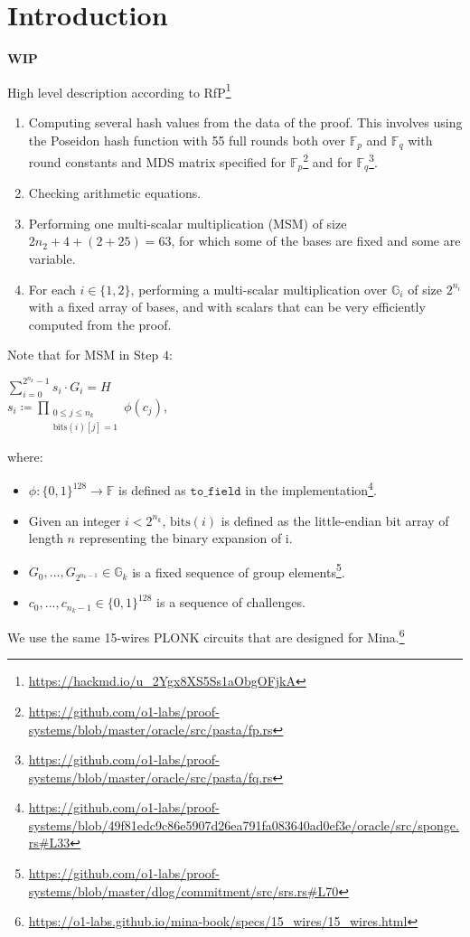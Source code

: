 \section{Introduction}
\label{section:circuit_introduction}
\textbf{WIP}

High level description according to RfP\footnote{\url{https://hackmd.io/u_2Ygx8XS5Ss1aObgOFjkA}}
\begin{enumerate}
    \item Computing several hash values from the data of the proof.
    This involves using the Poseidon hash function with 55 full rounds both over $\mathbb{F}_p$ and $\mathbb{F}_q$
    with round constants and MDS matrix specified for $\mathbb{F}_p$\footnote{\url{https://github.com/o1-labs/proof-systems/blob/master/oracle/src/pasta/fp.rs}}
    and for $\mathbb{F}_q$\footnote{\url{https://github.com/o1-labs/proof-systems/blob/master/oracle/src/pasta/fq.rs}}.
    \item Checking arithmetic equations.
    \item Performing one multi-scalar multiplication (MSM) of size $2n_2 + 4 + (2 + 25) = 63$,
    for which some of the bases are fixed and some are variable.
    \item For each $i \in \{1, 2\}$, performing a multi-scalar multiplication over $\mathbb{G}_i$ of size $2^{n_i}$
    with a fixed array of bases, and with scalars that can be very efficiently computed from the proof.
\end{enumerate}

Note that for MSM in Step $4$:
\begin{center}
    $\sum\limits_{i = 0}^{2^{n_k} - 1}s_i \cdot G_i = H$ \\
    $s_i \coloneqq \prod\limits_{\substack{0 \leq j \leq n_k \\  \text{bits}(i)[j] = 1}} \phi(c_j)$,
\end{center}
where:
\begin{itemize}
    \item $\phi\colon \{0, 1\}^{128} \to \mathbb{F}$ is defined as $\texttt{to\_field}$ in the implementation\footnote{
        \url{https://github.com/o1-labs/proof-systems/blob/49f81edc9c86e5907d26ea791fa083640ad0ef3e/oracle/src/sponge.rs\#L33}}.
    \item Given an integer $i < 2^{n_k}$, $\text{bits}(i)$ is defined as the little-endian bit array of length $n$ representing the binary expansion of i.
    \item $G_0, ..., G_{2^{n_k - 1}} \in \mathbb{G}_k$ is a fixed sequence of group elements\footnote{
        \url{https://github.com/o1-labs/proof-systems/blob/master/dlog/commitment/src/srs.rs\#L70}}.
    \item $c_0, ..., c_{n_k -1} \in \{0, 1\}^{128}$ is a sequence of challenges.
\end{itemize}

We use the same 15-wires PLONK circuits that are designed for Mina.\footnote{\url{https://o1-labs.github.io/mina-book/specs/15_wires/15_wires.html}}
